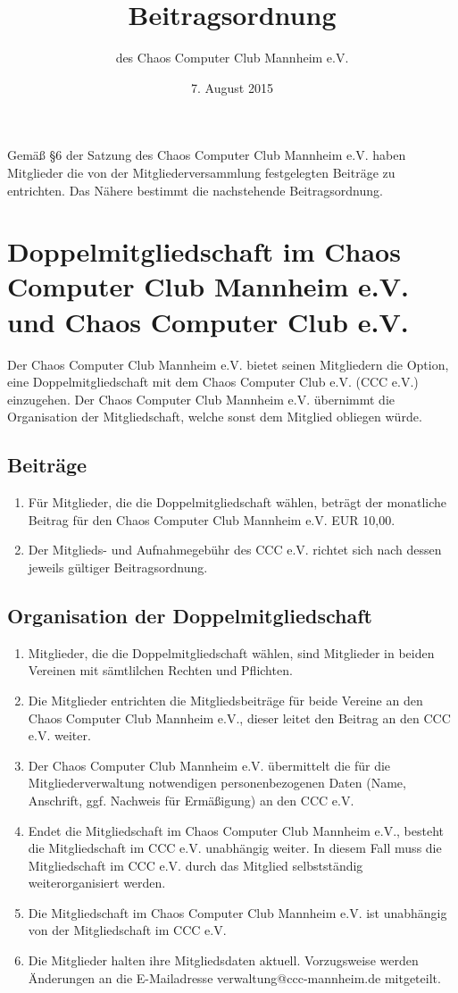 \documentclass[a4paper, 12pt]{scrartcl}
\title{Beitragsordnung}
\subtitle{des Chaos Computer Club Mannheim e.V.}
\date{7. August 2015}
\begin{document}
\maketitle
\sffamily
\noindent Gemäß §6 der Satzung des Chaos Computer Club Mannheim e.V. haben Mitglieder die von der Mitgliederversammlung festgelegten Beiträge zu entrichten. Das Nähere bestimmt die nachstehende Beitragsordnung.

\section{Doppelmitgliedschaft im Chaos Computer Club Mannheim e.V. und Chaos Computer Club e.V.}
\label{doppelmitgliedscahft}
Der Chaos Computer Club Mannheim e.V. bietet seinen Mitgliedern die Option, eine Doppelmitgliedschaft mit dem Chaos Computer Club e.V. (CCC e.V.) einzugehen. Der Chaos Computer Club Mannheim e.V. übernimmt die Organisation der Mitgliedschaft, welche sonst dem Mitglied obliegen würde.

\subsection{Beiträge}	
\label{doppelbeiträge}
\begin{enumerate}
	\item \label{doppeljahresbeitrag} Für Mitglieder, die die Doppelmitgliedschaft wählen, beträgt der monatliche Beitrag für den Chaos Computer Club Mannheim e.V. EUR 10,00.
	\item Der Mitglieds- und Aufnahmegebühr des CCC e.V. richtet sich nach dessen jeweils gültiger Beitragsordnung.
\end{enumerate}

\subsection{Organisation der Doppelmitgliedschaft}
\begin{enumerate}	
  \item Mitglieder, die die Doppelmitgliedschaft wählen, sind Mitglieder in beiden Vereinen mit sämtlilchen Rechten und Pflichten.
	\item Die Mitglieder entrichten die Mitgliedsbeiträge für beide Vereine an den Chaos Computer Club Mannheim e.V., dieser leitet den Beitrag an den CCC e.V. weiter.
	\item Der Chaos Computer Club Mannheim e.V. übermittelt die für die Mitgliederverwaltung notwendigen personenbezogenen Daten (Name, Anschrift, ggf. Nachweis für Ermäßigung) an den CCC e.V.
	\item Endet die Mitgliedschaft im Chaos Computer Club Mannheim e.V., besteht die Mitgliedschaft im CCC e.V. unabhängig weiter. In diesem Fall muss die Mitgliedschaft im CCC e.V. durch das Mitglied selbstständig weiterorganisiert werden.
	\item Die Mitgliedschaft im Chaos Computer Club Mannheim e.V. ist unabhängig von der Mitgliedschaft im CCC e.V.
	\item Die Mitglieder halten ihre Mitgliedsdaten aktuell. Vorzugsweise werden Änderungen an die E-Mailadresse verwaltung@ccc-mannheim.de mitgeteilt. 
\end{enumerate}
\end{document}
